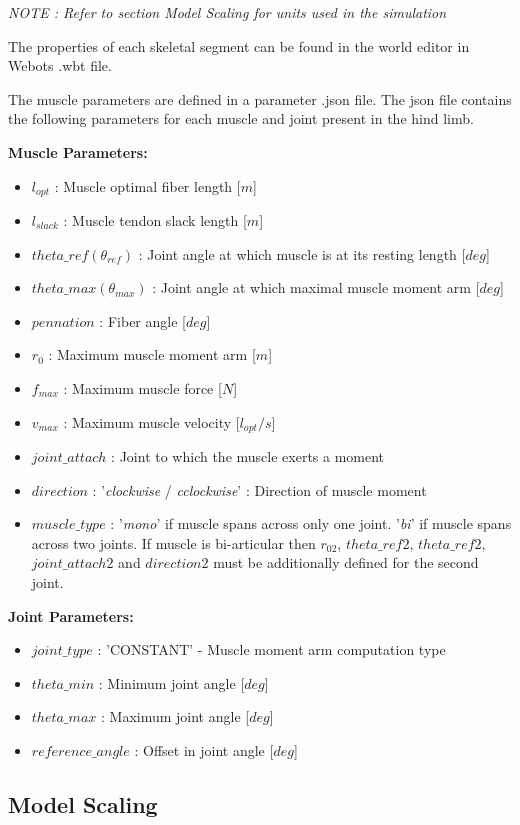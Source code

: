 \documentclass{cmc}
\begin{document}
\textit{NOTE : Refer to section Model Scaling for units used in the
  simulation}

The properties of each skeletal segment can be found in the world
editor in Webots .wbt file.

The muscle parameters are defined in a parameter .json file. The json
file contains the following parameters for each muscle and joint
present in the hind limb.

\textbf{Muscle Parameters:}
\begin{itemize}
\item $l_{opt}$ : Muscle optimal fiber length [$m$]
\item $l_{slack}$ : Muscle tendon slack length [$m$]
\item $theta\_ref(\theta_{ref})$ : Joint angle at which muscle is at
  its resting length [$deg$]
\item $theta\_max (\theta_{max})$ : Joint angle at which maximal
  muscle moment arm [$deg$]
\item $pennation$ : Fiber angle [$deg$]
\item $r_0$ : Maximum muscle moment arm [$m$]
\item $f_{max}$ : Maximum muscle force [$N$]
\item $v_{max}$ : Maximum muscle velocity [$l_{opt}/s$]
\item $joint\_attach$ : Joint to which the muscle exerts a moment
\item $direction$ : '\textit{clockwise} / \textit{cclockwise}' :
  Direction of muscle moment
\item $muscle\_type$ : '\textit{mono}' if muscle spans across only one
  joint. '\textit{bi}' if muscle spans across two joints. If muscle is
  bi-articular then $r_{02}$, $theta\_ref2$, $theta\_ref2$,
  $joint\_attach2$ and $direction2$ must be additionally defined for
  the second joint.
\end{itemize}

\textbf{Joint Parameters:}
\begin{itemize}
\item $joint\_type$ : 'CONSTANT' - Muscle moment arm computation type
\item $theta\_min$ : Minimum joint angle [$deg$]
\item $theta\_max$ : Maximum joint angle [$deg$]
\item $reference\_angle$ : Offset in joint angle [$deg$]
\end{itemize}

\subsection*{Model Scaling}
\label{sec:model-scaling}
\end{document}
